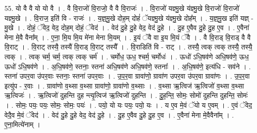 \documentclass[17pt]{extarticle}
\begin{document}
55. यो वै वै यो यो वै । . वै वि॒राजो॑ वि॒राजो॒ वै वै वि॒राजः॑ । . वि॒राजो॑ यज्ञ्मु॒खे य॑ज्ञ्मु॒खे वि॒राजो॑ वि॒राजो॑ यज्ञ्मु॒खे । . वि॒राज॒ इति॑ वि - राजः॑ । . य॒ज्ञ्॒मु॒खे दोह॒म् दोहं॑ ॅयज्ञ्मु॒खे य॑ज्ञ्मु॒खे दोह᳚म् । . य॒ज्ञ्॒मु॒ख इति॑ यज्ञ् - मु॒खे । . दोहं॒ ॅवेद॒ वेद॒ दोह॒म् दोहं॒ ॅवेद॑ । . वेद॑ दु॒हे दु॒हे वेद॒ वेद॑ दु॒हे । . दु॒ह ए॒वैव दु॒हे दु॒ह ए॒व । . ए॒वैना॑ मेना मे॒वै वैना᳚म् । . ए॒ना॒ मि॒य मि॒य मे॑ना मेना मि॒यम् । . इ॒यं ॅवै वा इ॒य मि॒यं ॅवै । . वै वि॒राड् वि॒राड् वै वै वि॒राट् । . वि॒राट् तस्यै॒ तस्यै॑ वि॒राड् वि॒राट् तस्यै᳚ । . वि॒राडिति॑ वि - राट् । . तस्यै॒ त्वक् त्वक् तस्यै॒ तस्यै॒ त्वक् । . त्वक् चर्म॒ चर्म॒ त्वक् त्वक् चर्म॑ । . चर्मोध॒ ऊध॒ श्चर्म॒ चर्मोधः॑ । . ऊधो॑ ऽधि॒षव॑णे अधि॒षव॑णे॒ ऊध॒ ऊधो॑ ऽधि॒षव॑णे । . अ॒धि॒षव॑णे॒ स्तनाः॒ स्तना॑ अधि॒षव॑णे अधि॒षव॑णे॒ स्तनाः᳚ । . अ॒धि॒षव॑णे॒ इत्य॑धि - सव॑ने । . स्तना॑ उपर॒वा उ॑पर॒वाः स्तनाः॒ स्तना॑ उपर॒वाः । . उ॒प॒र॒वा ग्रावा॑णो॒ ग्रावा॑ण उपर॒वा उ॑पर॒वा ग्रावा॑णः । . उ॒प॒र॒वा इत्यु॑प - र॒वाः । . ग्रावा॑णो व॒थ्सा व॒थ्सा ग्रावा॑णो॒ ग्रावा॑णो व॒थ्साः । . व॒थ्सा ऋ॒त्विज॑ ऋ॒त्विजो॑ व॒थ्सा व॒थ्सा ऋ॒त्विजः॑ । . ऋ॒त्विजो॑ दुहन्ति दुह न्त्यृ॒त्विज॑ ऋ॒त्विजो॑ दुहन्ति । . दु॒ह॒न्ति॒ सोमः॒ सोमो॑ दुहन्ति दुहन्ति॒ सोमः॑ । . सोमः॒ पयः॒ पयः॒ सोमः॒ सोमः॒ पयः॑ । . पयो॒ यो यः पयः॒ पयो॒ यः । . य ए॒व मे॒वं ॅयो य ए॒वम् । . ए॒वं ॅवेद॒ वेदै॒व मे॒वं ॅवेद॑ । . वेद॑ दु॒हे दु॒हे वेद॒ वेद॑ दु॒हे । . दु॒ह ए॒वैव दु॒हे दु॒ह ए॒व । . ए॒वैना॑ मेना मे॒वैवैना᳚म् । . ए॒ना॒मित्ये॑नाम् । \newline
\end{document}
